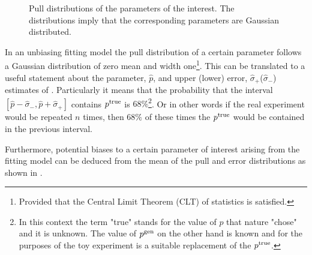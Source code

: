 \begin{figure}[h]
  \centering
  \begin{subfigure}{0.5\textwidth}
    \scalebox{0.60}{}
    \caption{}
    \label{pull_f0}
  \end{subfigure}%
  \hfill%
  \begin{subfigure}{0.5\textwidth}
    \scalebox{0.60}{}
    \caption{}
    \label{pull_fpar}
  \end{subfigure}
  \begin{subfigure}{0.5\textwidth}
    \scalebox{0.60}{}
    \caption{}
    \label{pull_AparPhase}
  \end{subfigure}%
  \hfill%
  \begin{subfigure}{0.5\textwidth}
    \scalebox{0.60}{}
    \caption{}
    \label{pull_AperpPhase}
  \end{subfigure}
\caption{Pull distributions of the parameters of the \pwave interest. The distributions imply that the corresponding parameters are Gaussian distributed.}
\label{pull_pwave}
\end{figure}

In an unbiasing fitting model the pull distribution of a certain parameter follows a Gaussian distribution of zero mean and width
one\footnote{Provided that the Central Limit Theorem (CLT) of statistics is satisfied.}.
This can be translated to a useful statement about the parameter, $\hat{p}$, and upper (lower) error, $\hat{\sigma}_+$($\hat{\sigma}_-$)
estimates of . Particularly it means that the probability that the interval
$[\hat{p}-\hat{\sigma}_-,\hat{p}+\hat{\sigma}_+]$ contains $p^{\rm true}$ is $68\%$\footnote{In this context the term "true" stands for the
value of $p$ that nature "chose" and it is unknown. The value of $p^{\rm gen}$ on the other hand is known and for the purposes of
the toy experiment is a suitable replacement of the $p^{\rm true}$.}. Or in other words if the real experiment would be repeated
$n$ times, then $68\%$ of these times the $p^{\rm true}$ would be contained in the previous interval.

Furthermore, potential biases to a certain parameter of interest arising from the fitting model
can be deduced from the mean of the pull and error distributions as shown in .

